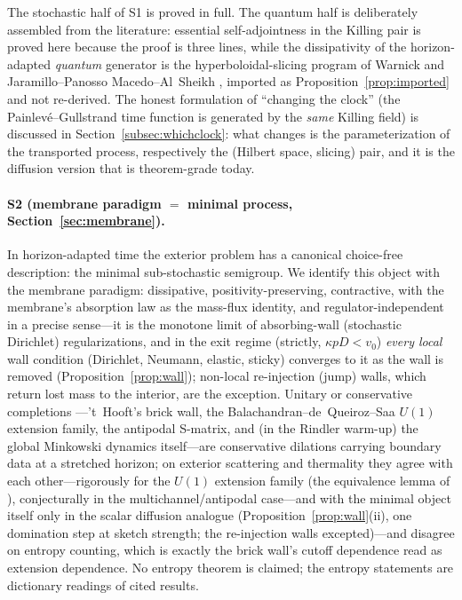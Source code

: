 \documentclass[11pt]{article}
\theoremstyle{definition}
\theoremstyle{remark}
\begin{document}
The stochastic half of S1 is proved in full. The quantum half is
deliberately assembled from the literature: essential
self-adjointness in the Killing pair is proved here because the proof
is three lines, while the dissipativity of the horizon-adapted
\emph{quantum} generator is the hyperboloidal-slicing program of
Warnick \cite{Warnick2015} and Jaramillo--Panosso
Macedo--Al~Sheikh \cite{Jaramillo2021}, imported as
Proposition~\ref{prop:imported} and not re-derived. The honest
formulation of ``changing the clock'' (the Painlev\'e--Gullstrand time
function is generated by the \emph{same} Killing field) is discussed
in Section~\ref{subsec:whichclock}: what changes is the
parameterization of the transported process, respectively the
(Hilbert space, slicing) pair, and it is the diffusion version that is
theorem-grade today.

\paragraph{S2 (membrane paradigm $=$ minimal process,
Section~\ref{sec:membrane}).} In horizon-adapted time the exterior
problem has a canonical choice-free description: the minimal
sub-stochastic semigroup. We identify this object with the membrane
paradigm: dissipative, positivity-preserving, contractive, with the
membrane's absorption law as the mass-flux identity, and
regulator-independent in a precise sense---it is the monotone limit of
absorbing-wall (stochastic Dirichlet) regularizations, and in the exit
regime (strictly, $\kappa pD<v_{0}$) \emph{every local} wall condition
(Dirichlet, Neumann, elastic, sticky)
converges to it as the wall is removed
(Proposition~\ref{prop:wall}); non-local re-injection (jump) walls,
which return lost mass to the interior, are the exception. Unitary or conservative completions
---'t~Hooft's brick wall, the Balachandran--de~Queiroz--Saa $U(1)$
extension family, the antipodal S-matrix, and (in the Rindler warm-up)
the global Minkowski dynamics itself---are conservative dilations
carrying boundary data at a stretched horizon; on exterior scattering
and thermality they agree with each other---rigorously for the $U(1)$
extension family (the equivalence lemma of \cite{Balachandran2018}),
conjecturally in the multichannel/antipodal case---and
with the minimal object itself only in the scalar diffusion analogue
(Proposition~\ref{prop:wall}(ii), one domination step at sketch
strength; the re-injection walls excepted)---and
disagree on entropy counting, which
is exactly the brick wall's cutoff dependence read as extension
dependence. No entropy theorem is
claimed; the entropy statements are dictionary readings of cited
results.
\end{document}
